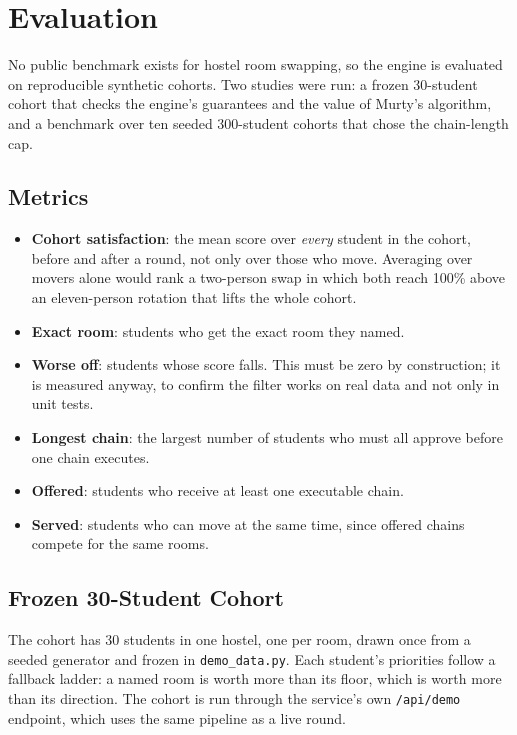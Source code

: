 
\chapter{Evaluation}
\label{ch:evaluation}

No public benchmark exists for hostel room swapping, so the engine is
evaluated on reproducible synthetic cohorts. Two studies were run: a
frozen 30-student cohort that checks the engine's guarantees and the
value of Murty's algorithm, and a benchmark over ten seeded 300-student
cohorts that chose the chain-length cap.

\section{Metrics}

\begin{itemize}
  \item \textbf{Cohort satisfaction}: the mean score over \emph{every}
  student in the cohort, before and after a round, not only over those
  who move. Averaging over movers alone would rank a two-person swap in
  which both reach 100\% above an eleven-person rotation that lifts the
  whole cohort.
  \item \textbf{Exact room}: students who get the exact room they named.
  \item \textbf{Worse off}: students whose score falls. This must be
  zero by construction; it is measured anyway, to confirm the filter
  works on real data and not only in unit tests.
  \item \textbf{Longest chain}: the largest number of students who must
  all approve before one chain executes.
  \item \textbf{Offered}: students who receive at least one executable
  chain.
  \item \textbf{Served}: students who can move at the same time, since
  offered chains compete for the same rooms.
\end{itemize}

\section{Frozen 30-Student Cohort}

The cohort has 30 students in one hostel, one per room, drawn once from
a seeded generator and frozen in \texttt{demo\_data.py}. Each student's
priorities follow a fallback ladder: a named room is worth more than its
floor, which is worth more than its direction. The cohort is run through
the service's own \texttt{/api/demo} endpoint, which uses the same
pipeline as a live round.

